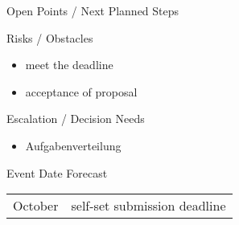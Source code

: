 \documentclass[]{kiesgrube}
\begin{document}
\begin{poster}
\begin{posterbox}[name=open,column=1,below=description]{Open Points / Next Planned Steps}
\begin{enumerate}
\end{enumerate}
\end{posterbox}
\begin{posterbox}[name=risks,column=1,below=open]{Risks / Obstacles}
\begin{itemize}
\item meet the deadline
\item acceptance of proposal 
\end{itemize}
\end{posterbox}
\begin{posterbox}[name=escalation,column=1,below=risks]{Escalation / Decision Needs}
\begin{itemize}
\item Aufgabenverteilung 
\end{itemize}
\end{posterbox}
\begin{posterbox}[name=event,below=progress,]{Event Date Forecast}
\begin{tabulary}{\textwidth}{lL}
October		&self-set submission deadline
\end{tabulary}
\end{posterbox}


\end{poster}
\end{document}
